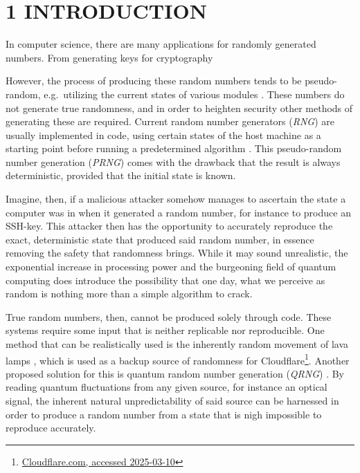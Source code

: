 \section{1 INTRODUCTION}\label{introduction}

In computer science, there are many applications for randomly generated numbers. From generating keys for cryptography

However, the process of producing these random numbers tends to be pseudo-random, e.g.~utilizing the current states of various modules \cite{randomness}. These numbers do not generate true randomness, and in order to heighten security other methods of generating these are required. Current random number generators (\emph{RNG}) are usually implemented in code, using certain states of the host machine as a starting point before running a predetermined algorithm \cite{randomness}. This pseudo-random number generation (\emph{PRNG}) comes with the drawback that the result is always deterministic, provided that the initial state is known.

Imagine, then, if a malicious attacker somehow manages to ascertain the state a computer was in when it generated a random number, for instance to produce an SSH-key. This attacker then has the opportunity to accurately reproduce the exact, deterministic state that produced said random number, in essence removing the safety that randomness brings. While it may sound unrealistic, the exponential increase in processing power and the burgeoning field of quantum computing does introduce the possibility that one day, what we perceive as random is nothing more than a simple algorithm to crack.

True random numbers, then, cannot be produced solely through code. These systems require some input that is neither replicable nor reproducible. One method that can be realistically used is the inherently random movement of lava lamps \cite{lavarand}, which is used as a backup source of randomness for Cloudflare\footnote{\href{https://blog.cloudflare.com/randomness-101-lavarand-in-production/}{Cloudflare.com, accessed 2025-03-10}}. Another proposed solution for this is quantum random number generation (\emph{QRNG}) \cite{QRNG}. By reading quantum fluctuations from any given source, for instance an optical signal, the inherent natural unpredictability of said source can be harnessed in order to produce a random number from a state that is nigh impossible to reproduce accurately.


